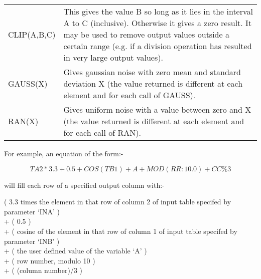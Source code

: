 \begin{small}
{{\begin{enumerate}
    \begin{tabular}{lp{4in}}
    CLIP(A,B,C) & This gives the value B so long as it lies in the
                 interval A to C (inclusive). Otherwise it gives a
                 zero result. It may be used to remove output values
                 outside a certain range (e.g. if a division operation
                 has resulted in very large output values). \\
    GAUSS(X)    & Gives gaussian noise with zero mean and standard
                 deviation X (the value returned is different at each
                 element and for each call of GAUSS). \\
    RAN(X)      & Gives uniform noise with a value between zero and X
                 (the value returned is different at each element and
                 for each call of RAN). \\
    \end{tabular}
  \end{enumerate}
                                                                               
  For example, an equation of the form:-
                                                                               
 $$        TA2*3.3 + 0.5 + COS(TB1) + A + MOD(RR:10.0) + CC\%3 $$
                                                                               
  will fill each row of a specified output column with:-
                                                                               
 \hspace*{1.0em}( 3.3 times the element in that row of column 2 of input 
    table specifed by parameter `INA' ) \hspace*{\fill} \\
  + ( 0.5 ) \hspace*{\fill} \\
  + ( cosine of the element in that row of column 1 of input table 
    specifed by parameter `INB' ) 
   \hspace*{\fill} \\
  + ( the user defined value of the variable `A' ) \hspace*{\fill} \\
  + ( row number, modulo 10 ) \hspace*{\fill} \\
  + ( (column number)/3 ) \hspace*{\fill} \\
 
}}
\end{small}
